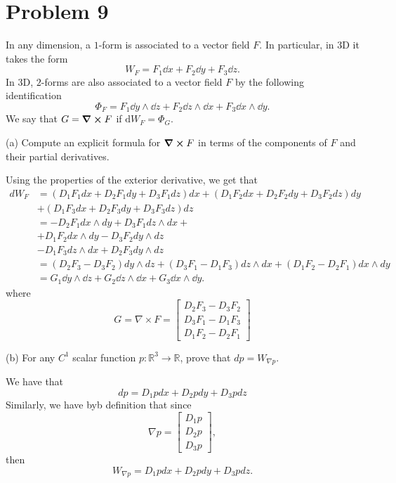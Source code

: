 \documentclass[11pt]{article}
\newcommand{\bbR}{\mathbb{R}}
\begin{document}
\section*{Problem 9}
\begin{problem}
    In any dimension, a $1$-form is associated to a vector field $F$. In particular, in
3D it takes the form
\[ W_F = F_1 \dd x + F_2 \dd y + F_3 \dd z.\]
In 3D, $2$-forms are also associated to a vector field $F$ by the following
identification
\[ \Phi_F = F_1 \dd y \wedge \dd z + F_2 \dd z \wedge \dd x + F_3 \dd x \wedge \dd y.\]
We say that $G = \curl F$ if $\mathrm d W_F = \Phi_G$.
\begin{itemize}
\begin{problem}
\item[(a)] Compute an explicit formula for $\curl F$ in terms of the
components of $F$ and their partial derivatives.
\end{problem}
\begin{solution}
    Using the properties of the exterior derivative, we get that 
    \begin{align*}
        dW_F &= (D_1F_1 dx + D_2F_1 dy + D_3 F_1dz) dx + (D_1F_2 dx + D_2F_2 dy + D_3 F_2dz) dy\\ \qquad &+ (D_1F_3 dx + D_2F_3 dy + D_3 F_3dz) dz\\
        &= -D_2F_1 dx \wedge dy + D_3F_1 dz \wedge dx +\\
        \qquad &+ D_1F_2 dx\wedge dy - D_3F_2 dy\wedge dz\\
        \qquad &- D_1F_3 dz \wedge dx + D_2F_3dy \wedge dz\\
        &= (D_2F_3 - D_3F_2)dy \wedge dz + (D_3F_1-D_1F_3)dz\wedge dx + (D_1F_2 - D_2F_1)dx\wedge dy\\
        &= G_1 \dd y \wedge \dd z + G_2 \dd z \wedge \dd x + G_3 \dd x \wedge \dd y.
    \end{align*}
    where 
    \[G = \nabla \times F = \begin{bmatrix}
        D_2F_3 - D_3F_2\\
        D_3F_1-D_1F_3\\
        D_1F_2 - D_2F_1
    \end{bmatrix}\]
\end{solution}
\begin{problem}
\item[(b)] For any $C^1$ scalar function $p : \bbR^3 \to \bbR$, prove that $dp= W_{\nabla p}$.    
\end{problem}
\begin{solution}
    We have that 
    \[dp = D_1pdx + D_2pdy + D_3pdz\]
    Similarly, we have byb definition that since 
    \[\nabla p = \begin{bmatrix}
        D_1p\\
        D_2p\\
        D_3p
    \end{bmatrix},\] then 
    \[W_{\nabla p} = D_1p dx + D_2p dy + D_3p dz.\]
\end{solution}


\end{itemize}
\end{problem}
\end{document}
